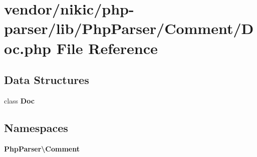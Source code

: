 \section{vendor/nikic/php-\/parser/lib/\+Php\+Parser/\+Comment/\+Doc.php File Reference}
\label{_doc_8php}
\subsection*{Data Structures}
\begin{DoxyCompactItemize}
\item 
class {\bf Doc}
\end{DoxyCompactItemize}
\subsection*{Namespaces}
\begin{DoxyCompactItemize}
\item 
 {\bf Php\+Parser\textbackslash{}\+Comment}
\end{DoxyCompactItemize}
